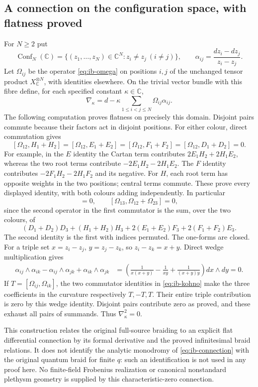 \subsection{A connection on the configuration space, with flatness proved}
For $N\ge2$ put
\[
 \operatorname{Conf}_N(\mathbb C)
 =\{(z_1,\ldots,z_N)\in\mathbb C^N:z_i\ne z_j\ (i\ne j)\},
 \qquad \alpha_{ij}=\frac{dz_i-dz_j}{z_i-z_j}.
\]
Let $\Omega_{ij}$ be the operator \eqref{eq:ib-omega} on positions
$i,j$ of the unchanged tensor product $X_{\mathbb C}^{\otimes N}$,
with identities elsewhere. On the trivial vector bundle with this
fibre define, for each specified constant $\kappa\in\mathbb C$,
\begin{equation}
 \nabla_\kappa=d-\kappa\sum_{1\le i<j\le N}\Omega_{ij}\alpha_{ij}.
 \label{eq:ib-connection}
\end{equation}
The following computation proves flatness on precisely this domain.
Disjoint pairs commute because their factors act in disjoint
positions. For either colour, direct commutation gives
\[
 [\Omega_{12},H_1+H_2]=[\Omega_{12},E_1+E_2]
 =[\Omega_{12},F_1+F_2]=[\Omega_{12},D_1+D_2]=0.
\]
For example, in the $E$ identity the Cartan term contributes
$2E_1H_2+2H_1E_2$, whereas the two root terms contribute
$-2E_1H_2-2H_1E_2$. The $F$ identity contributes
$-2F_1H_2-2H_1F_2$ and its negative. For $H$, each root
term has opposite weights in the two positions; central terms
commute. These prove every displayed identity, with both colours
adding independently. In particular
\begin{equation}
 [\Omega_{12},\Omega_{13}+\Omega_{23}]=0,
 \qquad [\Omega_{13},\Omega_{12}+\Omega_{23}]=0,
 \label{eq:ib-kohno}
\end{equation}
since the second operator in the first commutator is the sum,
over the two colours, of
\[
 (D_1+D_2)D_3+(H_1+H_2)H_3
       +2(E_1+E_2)F_3+2(F_1+F_2)E_3.
\]
The second identity is the first with indices permuted.
The one-forms are closed. For a triple set
$x=z_i-z_j$, $y=z_j-z_k$, so $z_i-z_k=x+y$. Direct wedge
multiplication gives
\begin{align*}
 \alpha_{ij}\wedge\alpha_{ik}
 -\alpha_{ij}\wedge\alpha_{jk}
 +\alpha_{ik}\wedge\alpha_{jk}
 &=\left(\frac1{x(x+y)}-\frac1{xy}
                  +\frac1{(x+y)y}\right)dx\wedge dy=0.
\end{align*}
If $T=[\Omega_{ij},\Omega_{ik}]$, the two commutator identities
in \eqref{eq:ib-kohno} make the three coefficients in the curvature
respectively $T,-T,T$. Their entire triple contribution is zero
by this wedge identity. Disjoint pairs contribute zero as proved,
and these exhaust all pairs of summands. Thus
$\nabla_\kappa^2=0$.

This construction relates the original full-source braiding to an
explicit flat differential connection by its formal derivative and
the proved infinitesimal braid relations. It does not identify the
analytic monodromy of \eqref{eq:ib-connection} with the original
quantum braid for finite $q$: such an identification is not used
in any proof here. No finite-field Frobenius realization or
canonical nonstandard plethysm geometry is supplied by this
characteristic-zero connection.
